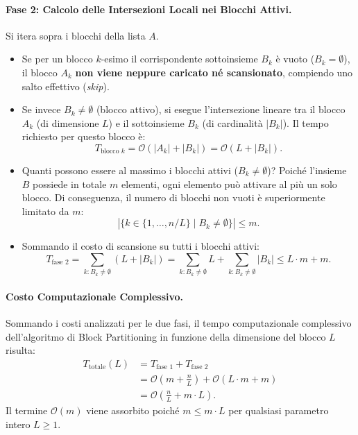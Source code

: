 \paragraph{Fase 2: Calcolo delle Intersezioni Locali nei Blocchi Attivi.}
Si itera sopra i blocchi della lista $A$.
\begin{itemize}
  \item Se per un blocco $k$-esimo il corrispondente sottoinsieme $B_k$ è vuoto ($B_k = \emptyset$), il blocco $A_k$ \textbf{non viene neppure caricato né scansionato}, compiendo uno salto effettivo (\textit{skip}).
  \item Se invece $B_k \neq \emptyset$ (blocco attivo), si esegue l'intersezione lineare tra il blocco $A_k$ (di dimensione $L$) e il sottoinsieme $B_k$ (di cardinalità $|B_k|$). Il tempo richiesto per questo blocco è:
  \begin{equation}
    T_{\text{blocco } k} = \mathcal{O}(|A_k| + |B_k|) = \mathcal{O}(L + |B_k|).
  \end{equation}
  \item Quanti possono essere al massimo i blocchi attivi ($B_k \neq \emptyset$)? Poiché l'insieme $B$ possiede in totale $m$ elementi, ogni elemento può attivare al più un solo blocco. Di conseguenza, il numero di blocchi non vuoti è superiormente limitato da $m$:
  \begin{equation}
    |\{k \in \{1, \dots, n/L\} \mid B_k \neq \emptyset\}| \le m.
  \end{equation}
  \item Sommando il costo di scansione su tutti i blocchi attivi:
  \begin{equation}
    T_{\text{fase 2}} = \sum_{k: B_k \neq \emptyset} (L + |B_k|) = \sum_{k: B_k \neq \emptyset} L + \sum_{k: B_k \neq \emptyset} |B_k| \le L \cdot m + m.
  \end{equation}
\end{itemize}

\paragraph{Costo Computazionale Complessivo.}
Sommando i costi analizzati per le due fasi, il tempo computazionale complessivo dell'algoritmo di Block Partitioning in funzione della dimensione del blocco $L$ risulta:
\begin{align}
  T_{\text{totale}}(L) &= T_{\text{fase 1}} + T_{\text{fase 2}} \nonumber \\
  &= \mathcal{O}\left(m + \frac{n}{L}\right) + \mathcal{O}(L \cdot m + m) \nonumber \\
  &= \mathcal{O}\left(\frac{n}{L} + m \cdot L\right).
  \label{eq:block-cost-function}
\end{align}
Il termine $\mathcal{O}(m)$ viene assorbito poiché $m \le m \cdot L$ per qualsiasi parametro intero $L \ge 1$.

